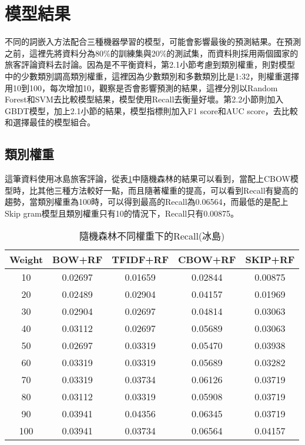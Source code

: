 	
\section{模型結果}

	不同的詞嵌入方法配合三種機器學習的模型，可能會影響最後的預測結果。在預測之前，這裡先將資料分為80\%的訓練集與20\%的測試集，而資料則採用兩個國家的旅客評論資料去討論。因為是不平衡資料，第2.1小節考慮到類別權重，則對模型中的少數類別調高類別權重，這裡因為少數類別和多數類別比是1:32，則權重選擇用10到100，每次增加10，觀察是否會影響預測的結果，這裡分別以Random Forest和SVM去比較模型結果，模型使用Recall去衡量好壞。第2.2小節則加入GBDT模型，加上2.1小節的結果，模型指標則加入F1 score和AUC score，去比較和選擇最佳的模型組合。
	
\subsection{類別權重}

	這筆資料使用冰島旅客評論，從表\ref{tab3}中隨機森林的結果可以看到，當配上CBOW模型時，比其他三種方法較好一點，而且隨著權重的提高，可以看到Recall有變高的趨勢，當類別權重為100時，可以得到最高的Recall為0.06564，而最低的是配上Skip gram模型且類別權重只有10的情況下，Recall只有0.00875。
	
	\begin{table}[H]
	\centering
	\caption{隨機森林不同權重下的Recall(冰島)}
	\begin{tabular}{|c|cccc|}
	\toprule
	 Weight & BOW+RF & TFIDF+RF & CBOW+RF & SKIP+RF \\
	\midrule
	10 & 0.02697 & 0.01659 & 0.02844 & 0.00875 \\
	\midrule
	20 & 0.02489 & 0.02904 & 0.04157 & 0.01969 \\
	\midrule
	30 & 0.02904 & 0.02697 & 0.04814 & 0.03063 \\
	\midrule
	40 & 0.03112 & 0.02697 & 0.05689 & 0.03063 \\
	\midrule
	50 & 0.02697 & 0.03319 & 0.05470 & 0.03938 \\
	\midrule
	60 & 0.03319 & 0.03319 & 0.05689 & 0.03282 \\
	\midrule
	70 & 0.03319 & 0.03734 & 0.06126 & 0.03719 \\
	\midrule
	80 & 0.03112 & 0.03319 & 0.05908 & 0.03719 \\
	\midrule
	90 & 0.03941 & 0.04356 & 0.06345 & 0.03719 \\
	\midrule
	100 & 0.03941 & 0.03734 & 0.06564 & 0.04157 \\
	\bottomrule
	\end{tabular}
	\label{tab3}
	\end{table}
	
